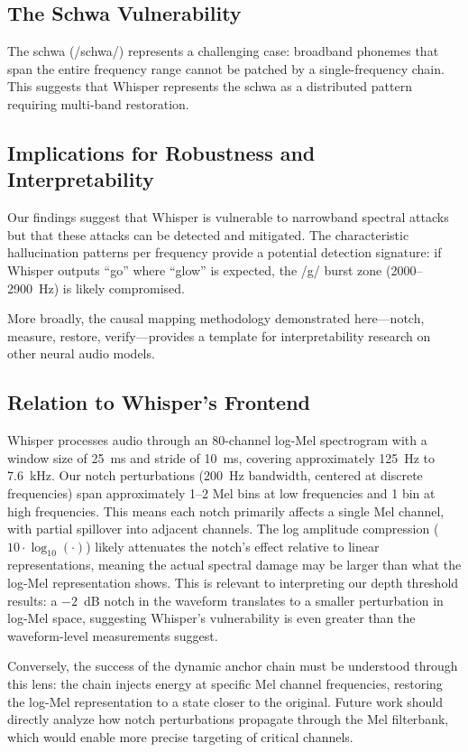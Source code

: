 \documentclass[11pt,a4paper]{article}
\begin{document}
\subsection{The Schwa Vulnerability}
The schwa (/{schwa}/) represents a challenging case:
broadband phonemes that span the entire frequency range cannot be patched by a
single-frequency chain. This suggests that Whisper represents the schwa as a
distributed pattern requiring multi-band restoration.

\subsection{Implications for Robustness and Interpretability}
Our findings suggest that Whisper is vulnerable to narrowband spectral attacks
but that these attacks can be detected and mitigated. The characteristic
hallucination patterns per frequency provide a potential detection signature: if
Whisper outputs ``go'' where ``glow'' is expected, the /g/ burst zone
(2000--2900~Hz) is likely compromised.

More broadly, the causal mapping methodology demonstrated here---notch, measure,
restore, verify---provides a template for interpretability research on other
neural audio models.

\subsection{Relation to Whisper's Frontend}
Whisper processes audio through an 80-channel log-Mel spectrogram with a
window size of 25~ms and stride of 10~ms, covering approximately 125~Hz to
7.6~kHz. Our notch perturbations (200~Hz bandwidth, centered at discrete
frequencies) span approximately 1--2 Mel bins at low frequencies and 1 bin at
high frequencies. This means each notch primarily affects a single Mel channel,
with partial spillover into adjacent channels. The log amplitude compression
($10 \cdot \log_{10}(\cdot)$) likely attenuates the notch's effect relative to
linear representations, meaning the actual spectral damage may be larger than
what the log-Mel representation shows. This is relevant to interpreting our
depth threshold results: a $-2$~dB notch in the waveform translates to a smaller
perturbation in log-Mel space, suggesting Whisper's vulnerability is even
greater than the waveform-level measurements suggest.

Conversely, the success of the dynamic anchor chain must be understood through
this lens: the chain injects energy at specific Mel channel frequencies,
restoring the log-Mel representation to a state closer to the original. Future
work should directly analyze how notch perturbations propagate through the
Mel filterbank, which would enable more precise targeting of critical channels.
\end{document}
